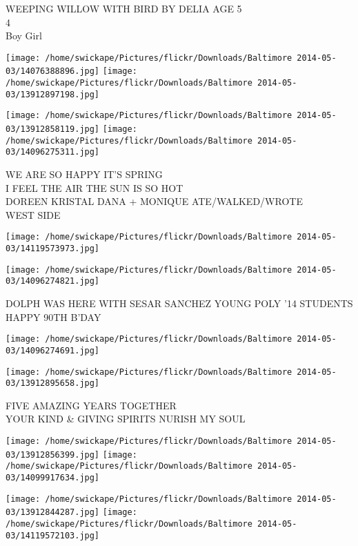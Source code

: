 \documentclass[10pt,letterpaper]{article}
\begin{document}
WEEPING WILLOW WITH BIRD BY DELIA AGE 5\\
4\\
Boy Girl\\
\pagebreak

\texttt{[image: /home/swickape/Pictures/flickr/Downloads/Baltimore 2014-05-03/14076388896.jpg]}
\texttt{[image: /home/swickape/Pictures/flickr/Downloads/Baltimore 2014-05-03/13912897198.jpg]}

\texttt{[image: /home/swickape/Pictures/flickr/Downloads/Baltimore 2014-05-03/13912858119.jpg]}
\texttt{[image: /home/swickape/Pictures/flickr/Downloads/Baltimore 2014-05-03/14096275311.jpg]}

WE ARE SO HAPPY IT'S SPRING\\
I FEEL THE AIR THE SUN IS SO HOT\\
DOREEN KRISTAL DANA + MONIQUE ATE/WALKED/WROTE\\
WEST SIDE\\
\pagebreak

\texttt{[image: /home/swickape/Pictures/flickr/Downloads/Baltimore 2014-05-03/14119573973.jpg]}

\vspace{0.25in}
\texttt{[image: /home/swickape/Pictures/flickr/Downloads/Baltimore 2014-05-03/14096274821.jpg]}

DOLPH WAS HERE WITH SESAR SANCHEZ YOUNG POLY '14 STUDENTS\\
HAPPY 90TH B'DAY\\
\pagebreak

\texttt{[image: /home/swickape/Pictures/flickr/Downloads/Baltimore 2014-05-03/14096274691.jpg]}

\vspace{0.25in}
\texttt{[image: /home/swickape/Pictures/flickr/Downloads/Baltimore 2014-05-03/13912895658.jpg]}

FIVE AMAZING YEARS TOGETHER\\
YOUR KIND \& GIVING SPIRITS NURISH MY SOUL\\
\pagebreak

\texttt{[image: /home/swickape/Pictures/flickr/Downloads/Baltimore 2014-05-03/13912856399.jpg]}
\texttt{[image: /home/swickape/Pictures/flickr/Downloads/Baltimore 2014-05-03/14099917634.jpg]}

\texttt{[image: /home/swickape/Pictures/flickr/Downloads/Baltimore 2014-05-03/13912844287.jpg]}
\texttt{[image: /home/swickape/Pictures/flickr/Downloads/Baltimore 2014-05-03/14119572103.jpg]}
\end{document}
